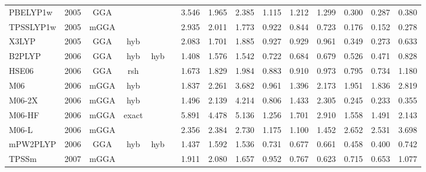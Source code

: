 \begin{landscape}
\begin{longtable}{lcccccrrrrrrrrr}
    PBELYP1w         & 2005 & GGA  &          &             &           & 3.546             & 1.965             & 2.385  & 1.115              & 1.212             & 1.299  & 0.300   & 0.287 & 0.380 \\
    TPSSLYP1w        & 2005 & mGGA &          &             &           & 2.935             & 2.011             & 1.773  & 0.922              & 0.844             & 0.723  & 0.176   & 0.152 & 0.278 \\
    X3LYP            & 2005 & GGA  & hyb      &             &           & 2.083             & 1.701             & 1.885  & 0.927              & 0.929             & 0.961  & 0.349   & 0.273 & 0.633 \\
    B2PLYP           & 2006 & GGA  & hyb      & hyb         &           & 1.408             & 1.576             & 1.542  & 0.722              & 0.684             & 0.679  & 0.526   & 0.471 & 0.828 \\
    HSE06            & 2006 & GGA  & rsh      &             &           & 1.673             & 1.829             & 1.984  & 0.883              & 0.910             & 0.973  & 0.795   & 0.734 & 1.180 \\
    M06              & 2006 & mGGA & hyb      &             &           & 1.837             & 2.261             & 3.682  & 0.961              & 1.396             & 2.173  & 1.951   & 1.836 & 2.819 \\
    M06-2X           & 2006 & mGGA & hyb      &             &           & 1.496             & 2.139             & 4.214  & 0.806              & 1.433             & 2.305  & 0.245   & 0.233 & 0.355 \\
    M06-HF           & 2006 & mGGA & exact    &             &           & 5.891             & 4.478             & 5.136  & 1.256              & 1.701             & 2.910  & 1.558   & 1.491 & 2.143 \\
    M06-L            & 2006 & mGGA &          &             &           & 2.356             & 2.384             & 2.730  & 1.175              & 1.100             & 1.452  & 2.652   & 2.531 & 3.698 \\
    mPW2PLYP         & 2006 & GGA  & hyb      & hyb         &           & 1.437             & 1.592             & 1.536  & 0.731              & 0.677             & 0.661  & 0.458   & 0.400 & 0.742 \\
    TPSSm            & 2007 & mGGA &          &             &           & 1.911             & 2.080             & 1.657  & 0.952              & 0.767             & 0.623  & 0.715   & 0.653 & 1.077 \\

\end{longtable}
\end{landscape}
